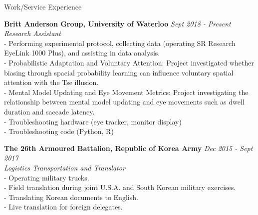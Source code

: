 \documentclass{resume} %
\begin{document}
\begin{rSection}{Work/Service Experience}

	{\bf Britt Anderson Group, University of Waterloo} \hfill {\em Sept 2018 - Present} 
	\\{\textit{Research Assistant}}
	\\- Performing experimental protocol, collecting data (operating SR Research EyeLink 1000 Plus), and assisting in data analysis.
	\\- Probabilistic Adaptation and Voluntary Attention: Project investigated whether biasing through spacial probability learning can influence voluntary spatial attention with the Tse illusion.
	\\- Mental Model Updating and Eye Movement Metrics: Project investigating the relationship between mental model updating and eye movements such as dwell duration and saccade latency.
	\\- Troubleshooting hardware (eye tracker, monitor display)
	\\- Troubleshooting code (Python, R)
	
	
	{\bf The 26th Armoured Battalion, Republic of Korea Army} \hfill {\em Dec 2015 - Sept 2017} 
	\\{\textit{Logistics Transportation and Translator}}
	\\- Operating military trucks.
	\\- Field translation during joint U.S.A. and South Korean military exercises.
	\\- Translating Korean documents to English.
	\\- Live translation for foreign delegates.

\end{rSection}
\end{document}
